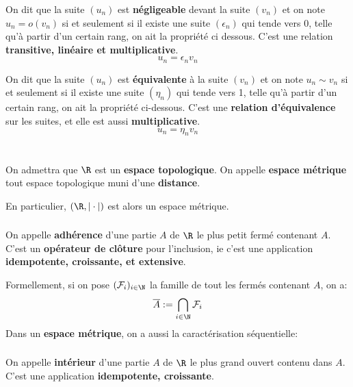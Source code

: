 On dit que la suite \((u_n)\) est \textbf{négligeable} devant la suite \((v_n)\) et on note \(u_n = o(v_n)\) si et seulement si il existe une suite \((\epsilon_n)\) qui tende vers 0, telle qu'à partir d'un certain rang, on ait la propriété ci dessous.\+
C'est une relation \textbf{transitive, linéaire et multiplicative}.
\[
    u_n = \epsilon_n v_n
\]

On dit que la suite \((u_n)\) est \textbf{équivalente} à la suite \((v_n)\) et on note \(u_n \sim v_n\) si et seulement si il existe une suite \((\eta_n)\) qui tende vers 1, telle qu'à partir d'un certain rang, on ait la propriété ci-dessous.\+ 
C'est une \textbf{relation d'équivalence} sur les suites, et elle est aussi \textbf{multiplicative}. 
\[
    u_n = \eta_n v_n
\]


\chapter*{}
On admettra que \(\R\) est un \textbf{espace topologique}.\+
On appelle \textbf{espace métrique} tout espace topologique muni d'une \textbf{distance}.\<

En particulier, \((\R, |\cdot|)\) est alors un espace métrique.

\subsection*{}
On appelle \textbf{adhérence} d'une partie \(A\) de \(\R\) le plus petit fermé contenant \(A\). C'est un \textbf{opérateur de clôture} pour l'inclusion, ie c'est une application \textbf{idempotente, croissante, et extensive}.\<

Formellement, si on pose \((\mathcal{F}_i)_{i \in \N}\) la famille de tout les fermés contenant \(A\), on a:
\[
    \overline{A} := \bigcap_{i \in \N} \mathcal{F}_i
\]
Dans un \textbf{espace métrique}, on a aussi la caractérisation séquentielle:
\begin{center}
\end{center}

\subsection*{}
On appelle \textbf{intérieur} d'une partie \(A\) de \(\R\) le plus grand ouvert contenu dans \(A\). C'est une application \textbf{idempotente, croissante}.\<

